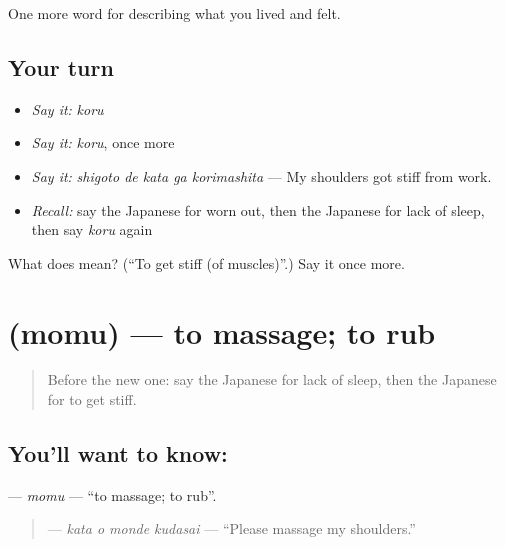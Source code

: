 \begin{grammarlens}[title={What you've built}]
One more word for describing what you lived and felt.
\end{grammarlens}

\subsection*{Your turn}
\begin{itemize}
\raggedright
  \item \emph{Say it:} \emph{koru}
  \item \emph{Say it:} \emph{koru}, once more
  \item \emph{Say it:} \emph{shigoto de kata ga korimashita} — My shoulders got stiff from work.
  \item \emph{Recall:} say the Japanese for worn out, then the Japanese for lack of sleep, then say \emph{koru} again
\end{itemize}

\begin{tcolorbox}[breakable,colback=teal!4,colframe=teal!35!black,title={Before you move on}]
What does  mean? (\textquotedblleft{}To get stiff (of muscles)\textquotedblright{}.) Say it once more.
\end{tcolorbox}
\section[\texorpdfstring{\ja{もむ} (momu)}{もむ (momu)}]{ (momu) — to massage; to rub}

\label{lesson:JA-C448-momu}



\begin{quote}
Before the new one: say the Japanese for lack of sleep, then the Japanese for to get stiff.
\end{quote}

\subsection*{You'll want to know: }
\textbf{} — \emph{momu} — \textquotedblleft{}to massage; to rub\textquotedblright{}.

\begin{quote}
\textbf{  } — \emph{kata o monde kudasai} — \textquotedblleft{}Please massage my shoulders.\textquotedblright{}
\end{quote}

